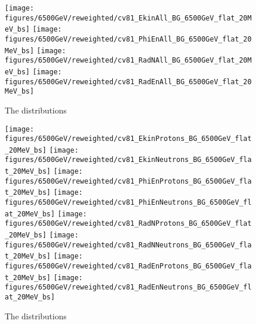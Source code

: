 \begin{figure}
\begin{center}
  \texttt{[image: figures/6500GeV/reweighted/cv81\_EkinAll\_BG\_6500GeV\_flat\_20MeV\_bs]}
  \texttt{[image: figures/6500GeV/reweighted/cv81\_PhiEnAll\_BG\_6500GeV\_flat\_20MeV\_bs]}
  \texttt{[image: figures/6500GeV/reweighted/cv81\_RadNAll\_BG\_6500GeV\_flat\_20MeV\_bs]}
  \texttt{[image: figures/6500GeV/reweighted/cv81\_RadEnAll\_BG\_6500GeV\_flat\_20MeV\_bs]}
\end{center}
\vspace{-0.6cm}
 \caption{The distributions 
  \label{fig:EkinPhiEn6p52}}
\end{figure}



\begin{figure}
\begin{center}
  \texttt{[image: figures/6500GeV/reweighted/cv81\_EkinProtons\_BG\_6500GeV\_flat\_20MeV\_bs]}
  \texttt{[image: figures/6500GeV/reweighted/cv81\_EkinNeutrons\_BG\_6500GeV\_flat\_20MeV\_bs]}
  \texttt{[image: figures/6500GeV/reweighted/cv81\_PhiEnProtons\_BG\_6500GeV\_flat\_20MeV\_bs]}
  \texttt{[image: figures/6500GeV/reweighted/cv81\_PhiEnNeutrons\_BG\_6500GeV\_flat\_20MeV\_bs]}
  \texttt{[image: figures/6500GeV/reweighted/cv81\_RadNProtons\_BG\_6500GeV\_flat\_20MeV\_bs]}
  \texttt{[image: figures/6500GeV/reweighted/cv81\_RadNNeutrons\_BG\_6500GeV\_flat\_20MeV\_bs]}
  \texttt{[image: figures/6500GeV/reweighted/cv81\_RadEnProtons\_BG\_6500GeV\_flat\_20MeV\_bs]}
  \texttt{[image: figures/6500GeV/reweighted/cv81\_RadEnNeutrons\_BG\_6500GeV\_flat\_20MeV\_bs]}
\end{center}
\vspace{-0.6cm}
 \caption{The distributions 
  \label{fig:ProtNeut6p52}} 
\end{figure}

\clearpage

